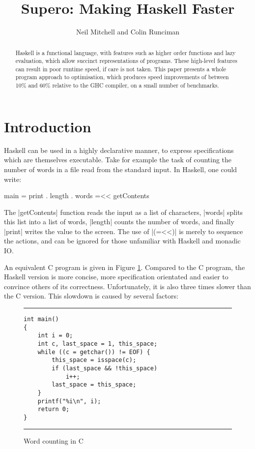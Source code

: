 \documentclass{llncs}
\newenvironment{fig}
    {\begin{figure}[tbp]\hrule}
    {\end{figure}}
\newcommand{\figend}{\hrule}
\begin{document}
\title{Supero: Making Haskell Faster}

\author{Neil Mitchell and Colin Runciman}


\maketitle              %

\begin{abstract}
Haskell is a functional language, with features such as higher order functions and lazy evaluation, which allow succinct representations of programs. These high-level features can result in poor runtime speed, if care is not taken. This paper presents a whole program approach to optimisation, which produces speed improvements of between 10\% and 60\% relative to the GHC compiler, on a small number of benchmarks.
\end{abstract}

\section{Introduction}

Haskell \cite{haskell} can be used in a highly declarative manner, to express specifications which are themselves executable. Take for example the task of counting the number of words in a file read from the standard input. In Haskell, one could write:

\begin{code}
main = print . length . words =<< getContents
\end{code}

The |getContents| function reads the input as a list of characters, |words| splits this list into a list of words, |length| counts the number of words, and finally |print| writes the value to the screen. The use of |(=<<)| is merely to sequence the actions, and can be ignored for those unfamiliar with Haskell and monadic IO.

An equivalent C program is given in Figure \ref{fig:c_words}. Compared to the C program, the Haskell version is more concise, more specification orientated and easier to convince others of its correctness. Unfortunately, it is also three times slower than the C version. This slowdown is caused by several factors:

\begin{fig}
\bigskip
\begin{verbatim}
int main()
{
	int i = 0;
	int c, last_space = 1, this_space;
	while ((c = getchar()) != EOF) {
		this_space = isspace(c);
		if (last_space && !this_space)
			i++;
		last_space = this_space;
	}
	printf("%i\n", i);
	return 0;
}
\end{verbatim}
\figend
\caption{Word counting in C}
\label{fig:c_words}
\end{fig}
\end{document}
